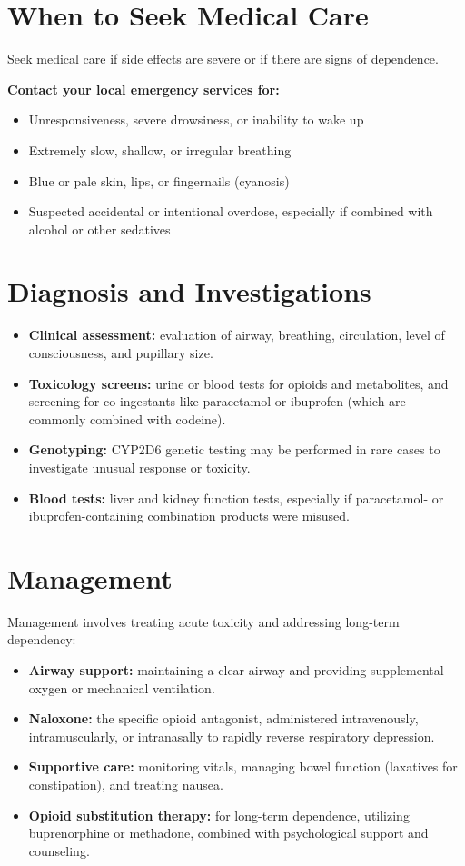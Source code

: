 \section*{When to Seek Medical Care}
Seek medical care if side effects are severe or if there are signs of dependence.

\textbf{Contact your local emergency services for:}
\begin{itemize}
    \item Unresponsiveness, severe drowsiness, or inability to wake up
    \item Extremely slow, shallow, or irregular breathing
    \item Blue or pale skin, lips, or fingernails (cyanosis)
    \item Suspected accidental or intentional overdose, especially if combined with alcohol or other sedatives
\end{itemize}

\section*{Diagnosis and Investigations}
\begin{itemize}
    \item \textbf{Clinical assessment:} evaluation of airway, breathing, circulation, level of consciousness, and pupillary size.
    \item \textbf{Toxicology screens:} urine or blood tests for opioids and metabolites, and screening for co-ingestants like paracetamol or ibuprofen (which are commonly combined with codeine).
    \item \textbf{Genotyping:} CYP2D6 genetic testing may be performed in rare cases to investigate unusual response or toxicity.
    \item \textbf{Blood tests:} liver and kidney function tests, especially if paracetamol- or ibuprofen-containing combination products were misused.
\end{itemize}

\section*{Management}
Management involves treating acute toxicity and addressing long-term dependency:

\begin{itemize}
    \item \textbf{Airway support:} maintaining a clear airway and providing supplemental oxygen or mechanical ventilation.
    \item \textbf{Naloxone:} the specific opioid antagonist, administered intravenously, intramuscularly, or intranasally to rapidly reverse respiratory depression.
    \item \textbf{Supportive care:} monitoring vitals, managing bowel function (laxatives for constipation), and treating nausea.
    \item \textbf{Opioid substitution therapy:} for long-term dependence, utilizing buprenorphine or methadone, combined with psychological support and counseling.
\end{itemize}

